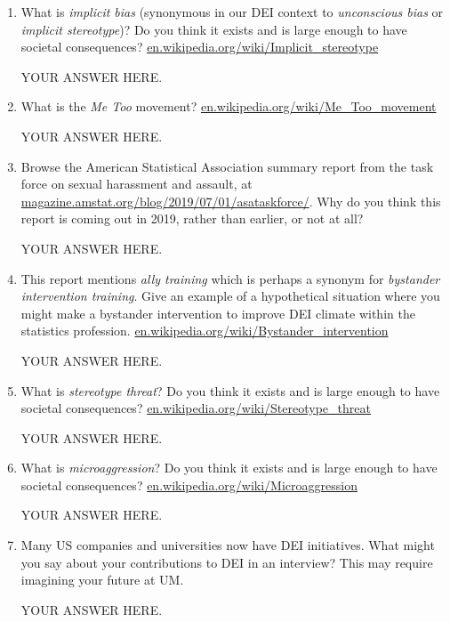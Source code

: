 \documentclass[12pt]{article}
\begin{document}
\begin{enumerate}

\item What is {\em implicit bias} (synonymous in our DEI context to {\em unconscious bias} or {\em implicit stereotype})? Do you think it exists and is large enough to have societal consequences? 
\url{en.wikipedia.org/wiki/Implicit_stereotype}

YOUR ANSWER HERE.

\item What is the {\em Me Too} movement? \url{en.wikipedia.org/wiki/Me_Too_movement}

YOUR ANSWER HERE.

\item Browse the American Statistical Association summary report from the task force on sexual harassment and assault, at \url{magazine.amstat.org/blog/2019/07/01/asataskforce/}.
Why do you think this report is coming out in 2019, rather than earlier, or not at all?

YOUR ANSWER HERE.

\item This report mentions {\em ally training} which is perhaps a synonym for {\em bystander intervention training}. Give an example of a hypothetical situation where you might make a bystander intervention to improve DEI climate within the statistics profession. \url{en.wikipedia.org/wiki/Bystander_intervention}

YOUR ANSWER HERE.

\item What is {\em stereotype threat}? Do you think it exists and is large enough to have societal consequences? \url{en.wikipedia.org/wiki/Stereotype_threat}

YOUR ANSWER HERE.

\item What is {\em microaggression}? Do you think it exists and is large enough to have societal consequences? \url{en.wikipedia.org/wiki/Microaggression}

YOUR ANSWER HERE.

\item Many US companies and universities now have DEI initiatives. What might you say about your contributions to DEI in an interview? This may require imagining your future at UM.

YOUR ANSWER HERE.

\end{enumerate}
\end{document}
